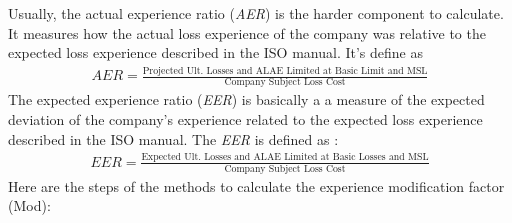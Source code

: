 \documentclass[11pt, english]{memoir}
\numberwithin{definition}{section}
\begin{document}
Usually, the actual experience ratio (\emph{AER}) is the harder component to calculate. It measures how the actual loss experience of the company was relative to the expected loss experience described in the ISO manual. It's define as 
\begin{align*}
AER = \frac{\text{Projected Ult. Losses and ALAE Limited at Basic Limit and MSL}}{\text{Company Subject Loss Cost}}
\end{align*}
The expected experience ratio (\emph{EER}) is basically a a measure of the expected deviation of the company's experience related to the expected loss experience described in the ISO manual. The \emph{EER} is defined as : 
\begin{align*}
EER = \frac{\text{Expected Ult. Losses and ALAE Limited at Basic Losses and MSL}}{\text{Company Subject Loss Cost}}
\end{align*}
Here are the steps of the methods to calculate the experience modification factor (Mod): 
\end{document}
